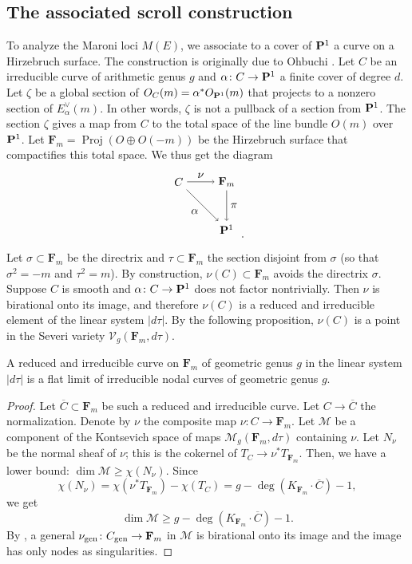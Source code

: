 \documentclass{article}
\renewcommand {\P}{{\bf P}}
\providecommand {\from}{{\colon}}
\providecommand{\proj}{\operatorname{Proj}}
\newcommand{\V}{\mathcal V}
\newcommand{\F}{{\mathbf F}}
\numberwithin{equation}{section}
\begin{document}
\subsection{The associated scroll construction}\label{sec:ass_scroll}
To analyze the Maroni loci $M(E)$, we associate to a cover of $\P^1$ a curve on a Hirzebruch surface. The construction is originally due to Ohbuchi \cite{ohbuchi:relations}. Let $C$ be an irreducible curve of arithmetic genus $g$ and $\alpha \from C \to \P^1$ a finite cover of degree $d$. Let $\zeta$ be a global section of $O_C(m) = \alpha^*O_{\P^1}(m)$ that projects to a nonzero section of $E^\vee_\alpha(m)$. In other words, $\zeta$ is not a pullback of a section from $\P^1$. The section $\zeta$ gives a map from $C$ to the total space of the line bundle $O(m)$ over $\P^1$. Let $\F_m = \proj (O \oplus O(-m))$ be the Hirzebruch surface that compactifies this total space. We thus get the diagram
\[
\begin{tikzpicture}[node distance=1.5cm]
  \node (C) {$C$};
  \node [right of =C] (F) {$\F_m$};
  \node [below of = F] (P) {$\P^1$};
  \draw [->] 
  (C) edge node [below left] {$\alpha$} (P) 
  (C) edge node[above] {$\nu$} (F) 
  (F) edge node [right] {$\pi$} (P);
\end{tikzpicture}.
\]
Let $\sigma \subset \F_m$ be the directrix and $\tau \subset \F_m$ the section disjoint from $\sigma$ (so that $\sigma^2 = -m$ and $\tau^2 = m$). By construction, $\nu(C) \subset \F_m$ avoids the directrix $\sigma$. Suppose $C$ is smooth and $\alpha \from C \to \P^1$ does not factor nontrivially. Then $\nu$ is birational onto its image, and therefore $\nu(C)$ is a reduced and irreducible element of the linear system $|d\tau|$. By the following proposition, $\nu(C)$ is a point in the Severi variety $\V_g(\F_m,d\tau)$. 

\begin{proposition}
  A reduced and irreducible curve on $\F_m$ of geometric genus $g$ in the linear system $|d\tau|$ is a flat limit of irreducible nodal curves of geometric genus $g$.
\end{proposition}
\begin{proof}
  Let $\overline C \subset \F_m$ be such a reduced and irreducible curve. Let $C \to \overline C$ the normalization. Denote by $\nu$ the composite map $\nu \from C \to \F_m$. Let $\mathcal M$ be a component of the Kontsevich space of maps $\mathcal M_{g}(\F_m, d\tau)$ containing $\nu$. Let $N_\nu$ be the normal sheaf of $\nu$; this is the cokernel of $T_C \to \nu^* T_{\F_m}$. Then, we have a lower bound: $\dim \mathcal M \geq \chi(N_\nu)$. Since
  \[ \chi(N_\nu) = \chi(\nu^* T_{\F_m}) - \chi(T_C) = g - \deg(K_{\F_m} \cdot \overline C) - 1,\]
  we get 
  \[\dim \mathcal M \geq g - \deg(K_{\F_m} \cdot \overline C) - 1.\]
  By \cite[Proposition~2.2]{joe:severi}, a general $\nu_{\rm gen} \from C_{\rm gen} \to \F_m$ in $\mathcal M$ is birational onto its image and the image has only nodes as singularities.
\end{proof}
\end{document}
